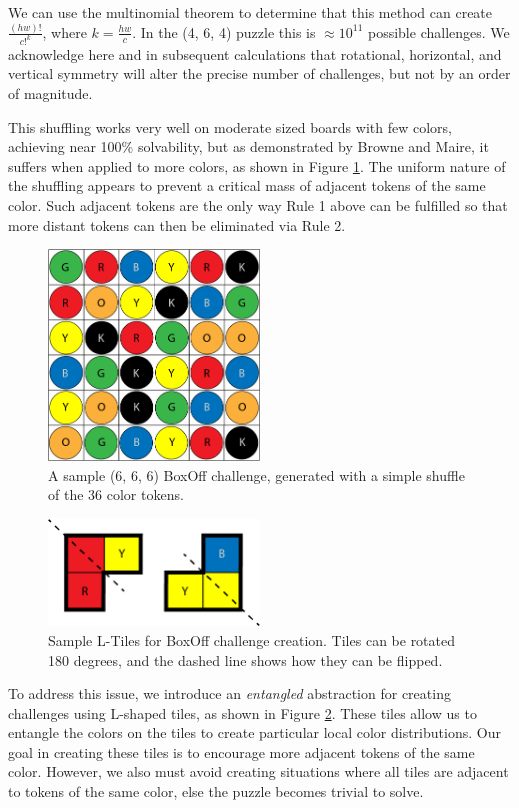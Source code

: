 \documentclass[journal]{IEEEtran}
\begin{document}
We can use the multinomial theorem to determine that this method can create
$\frac{(hw)!}{c!^{k}}$, where $k=\frac{hw}{c}$. In the (4, 6, 4) puzzle this is $\approx 10^{11}$ possible challenges.  We acknowledge here and in subsequent calculations that rotational, horizontal, and vertical symmetry will alter the precise number of challenges, but not by an order of magnitude.

This shuffling works very well on moderate sized boards with few colors, achieving near 100\% solvability, but as demonstrated by Browne and Maire, it suffers when applied to more colors, as shown in Figure \ref{fig:boxoff666}. The uniform nature of the shuffling appears to prevent a critical mass of adjacent tokens of the same color. Such adjacent tokens are the only way Rule 1 above can be fulfilled so that more distant tokens can then be eliminated via Rule 2.

\begin{figure}[t]
\centering
\includegraphics[width=5.6cm]{figure3.png}
\caption{A sample (6, 6, 6) BoxOff challenge, generated with a simple shuffle of the 36 color tokens. }
\label{fig:boxoff666}
\end{figure}


\begin{figure}[t]
\centering
\includegraphics[width=5.6cm]{figure4.png}
\caption{Sample L-Tiles for BoxOff challenge creation. Tiles can be rotated 180 degrees, and the dashed line shows how they can be flipped. }
\label{fig:ltiles}
\end{figure}

To address this issue, we introduce an {\it entangled} abstraction for creating challenges using L-shaped tiles, as shown in Figure \ref{fig:ltiles}. These tiles allow us to entangle the colors on the tiles to create particular local color distributions.
Our goal in creating these tiles is to encourage more adjacent tokens of the same color. However, we also must avoid creating situations where all tiles are adjacent to tokens of the same color, else the puzzle becomes trivial to solve. 
\end{document}
